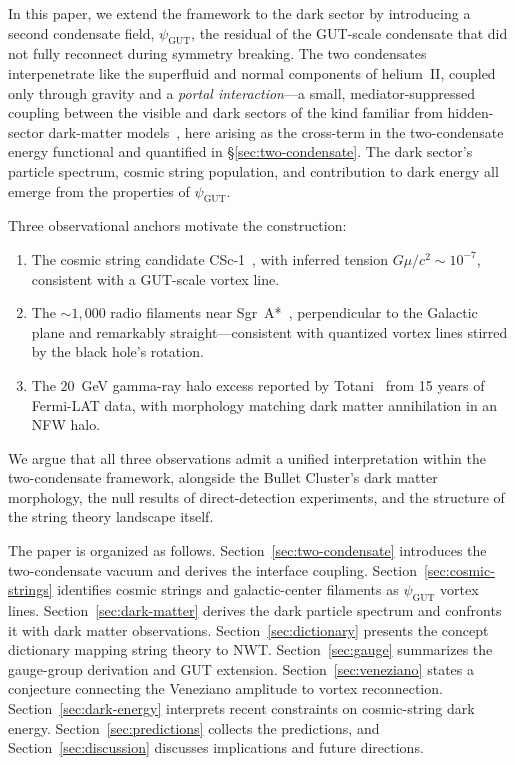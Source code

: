 \documentclass[11pt]{article}
\begin{document}
In this paper, we extend the framework to the dark sector by introducing a second condensate field, $\psi_\text{GUT}$, the residual of the GUT-scale condensate that did not fully reconnect during symmetry breaking.
The two condensates interpenetrate like the superfluid and normal components of helium~II, coupled only through gravity and a \emph{portal interaction}---a small, mediator-suppressed coupling between the visible and dark sectors of the kind familiar from hidden-sector dark-matter models~\cite{BerezhianiKhoury2015}, here arising as the cross-term in the two-condensate energy functional and quantified in \S\ref{sec:two-condensate}.
The dark sector's particle spectrum, cosmic string population, and contribution to dark energy all emerge from the properties of $\psi_\text{GUT}$.

Three observational anchors motivate the construction:
\begin{enumerate}
\item The cosmic string candidate CSc-1~\cite{Sazhina2019,Bulygin2023,Sazhina2025}, with inferred tension $G\mu/c^2 \sim 10^{-7}$, consistent with a GUT-scale vortex line.
\item The $\sim 1{,}000$ radio filaments near Sgr~A*~\cite{YusefZadeh2022}, perpendicular to the Galactic plane and remarkably straight---consistent with quantized vortex lines stirred by the black hole's rotation.
\item The $20$~GeV gamma-ray halo excess reported by Totani~\cite{Totani2025} from 15 years of Fermi-LAT data, with morphology matching dark matter annihilation in an NFW halo.
\end{enumerate}

We argue that all three observations admit a unified interpretation within the two-condensate framework, alongside the Bullet Cluster's dark matter morphology, the null results of direct-detection experiments, and the structure of the string theory landscape itself.

The paper is organized as follows.
Section~\ref{sec:two-condensate} introduces the two-condensate vacuum and derives the interface coupling.
Section~\ref{sec:cosmic-strings} identifies cosmic strings and galactic-center filaments as $\psi_\text{GUT}$ vortex lines.
Section~\ref{sec:dark-matter} derives the dark particle spectrum and confronts it with dark matter observations.
Section~\ref{sec:dictionary} presents the concept dictionary mapping string theory to NWT.
Section~\ref{sec:gauge} summarizes the gauge-group derivation and GUT extension.
Section~\ref{sec:veneziano} states a conjecture connecting the Veneziano amplitude to vortex reconnection.
Section~\ref{sec:dark-energy} interprets recent constraints on cosmic-string dark energy.
Section~\ref{sec:predictions} collects the predictions, and Section~\ref{sec:discussion} discusses implications and future directions.
\end{document}
